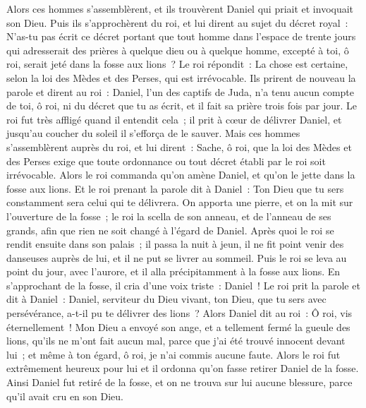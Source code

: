 \begin{multicols}{2}
Alors ces hommes s'assemblèrent, et ils trouvèrent Daniel qui priait et invoquait son Dieu.
Puis ils s'approchèrent du roi, et lui dirent au sujet du décret royal~: N'as-tu pas écrit ce décret portant que tout homme dans l'espace de trente jours qui adresserait des prières à quelque dieu ou à quelque homme, excepté à toi, ô roi, serait jeté dans la fosse aux lions~? Le roi répondit~: La chose est certaine, selon la loi des Mèdes et des Perses, qui est irrévocable.
Ils prirent de nouveau la parole et dirent au roi~: Daniel, l'un des captifs de Juda, n'a tenu aucun compte de toi, ô roi, ni du décret que tu as écrit, et il fait sa prière trois fois par jour.
Le roi fut très affligé quand il entendit cela~; il prit à cœur de délivrer Daniel, et jusqu'au coucher du soleil il s'efforça de le sauver.
Mais ces hommes s'assemblèrent auprès du roi, et lui dirent~: Sache, ô roi, que la loi des Mèdes et des Perses exige que toute ordonnance ou tout décret établi par le roi soit irrévocable.
Alors le roi commanda qu'on amène Daniel, et qu'on le jette dans la fosse aux lions. Et le roi prenant la parole dit à Daniel~: Ton Dieu que tu sers constamment sera celui qui te délivrera.
On apporta une pierre, et on la mit sur l'ouverture de la fosse~; le roi la scella de son anneau, et de l'anneau de ses grands, afin que rien ne soit changé à l'égard de Daniel.
Après quoi le roi se rendit ensuite dans son palais~; il passa la nuit à jeun, il ne fit point venir des danseuses auprès de lui, et il ne put se livrer au sommeil.
Puis le roi se leva au point du jour, avec l'aurore, et il alla précipitamment à la fosse aux lions.
En s'approchant de la fosse, il cria d'une voix triste~: Daniel~! Le roi prit la parole et dit à Daniel~: Daniel, serviteur du Dieu vivant, ton Dieu, que tu sers avec persévérance, a-t-il pu te délivrer des lions~?
Alors Daniel dit au roi~: Ô roi, vis éternellement~!
Mon Dieu a envoyé son ange, et a tellement fermé la gueule des lions, qu'ils ne m'ont fait aucun mal, parce que j'ai été trouvé innocent devant lui~; et même à ton égard, ô roi, je n'ai commis aucune faute.
Alors le roi fut extrêmement heureux pour lui et il ordonna qu'on fasse retirer Daniel de la fosse. Ainsi Daniel fut retiré de la fosse, et on ne trouva sur lui aucune blessure, parce qu'il avait cru en son Dieu.

\end{multicols}
